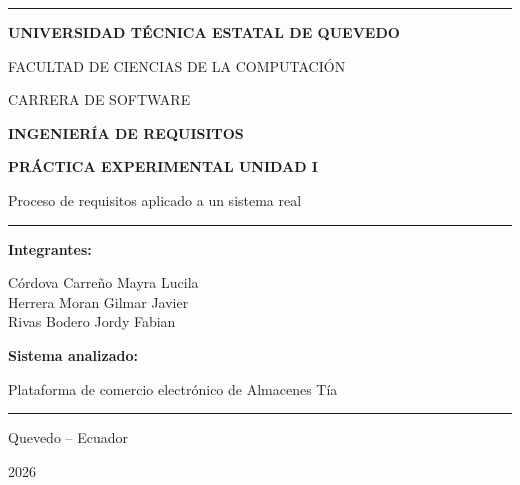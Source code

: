 \documentclass[12pt,a4paper]{article}
\begin{document}
\begin{titlepage}
    \thispagestyle{empty}
    \centering
    \vspace*{1.0cm}
    {\color{TurquesaInforme}\rule{0.86\textwidth}{2.2pt}\par}
    \vspace{0.65cm}
    {\large\bfseries\color{AzulInforme} UNIVERSIDAD TÉCNICA ESTATAL DE QUEVEDO\par}
    \vspace{0.35cm}
    {\normalsize FACULTAD DE CIENCIAS DE LA COMPUTACIÓN\par}
    \vspace{0.2cm}
    {\normalsize CARRERA DE SOFTWARE\par}
    \vspace{1.35cm}
    {\Large\bfseries\color{AzulInforme} INGENIERÍA DE REQUISITOS\par}
    \vspace{0.65cm}
    {\LARGE\bfseries\color{AzulInforme} PRÁCTICA EXPERIMENTAL UNIDAD I\par}
    \vspace{0.45cm}
    {\large\color{GrisInforme} Proceso de requisitos aplicado a un sistema real\par}
    \vspace{0.85cm}
    {\color{LineaInforme}\rule{0.72\textwidth}{0.8pt}\par}
    \vspace{0.75cm}
    {\large\bfseries\color{AzulInforme} Integrantes:\par}
    \vspace{0.3cm}
    Córdova Carreño Mayra Lucila\\[0.18cm]
    Herrera Moran Gilmar Javier\\[0.18cm]
    Rivas Bodero Jordy Fabian
    \vspace{0.9cm}

    {\large\bfseries\color{AzulInforme} Sistema analizado:\par}
    \vspace{0.2cm}
    {\large Plataforma de comercio electrónico de Almacenes Tía\par}
    \vfill
    {\color{TurquesaInforme}\rule{0.86\textwidth}{1.2pt}\par}
    \vspace{0.4cm}
    {\normalsize Quevedo -- Ecuador\par}
    {\normalsize 2026\par}
\end{titlepage}
\end{document}
